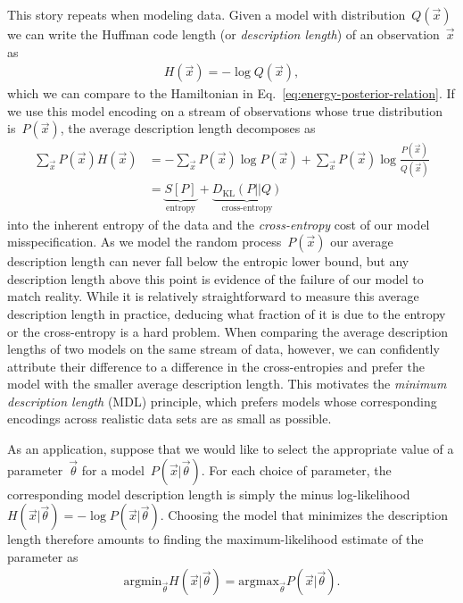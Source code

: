 This story repeats when modeling data. Given a model with distribution~$Q(\vec{x})$ we can write the Huffman code length (or \emph{description length}) of an observation~$\vec{x}$ as \begin{align}
    H(\vec{x}) = -\log Q(\vec{x}),
\end{align} 
which we can compare to the Hamiltonian in Eq.~\eqref{eq:energy-posterior-relation}. If we use this model encoding on a stream of observations whose true distribution is~$P(\vec{x})$, the average description length decomposes as \begin{align}
    \sum_{\vec{x}} P(\vec{x}) H(\vec{x}) &= -\sum_{\vec{x}} P(\vec{x})\log P(\vec{x}) + \sum_{\vec{x}} P(\vec{x})\log \frac{P(\vec{x})}{Q(\vec{x})} \nonumber \\
    &= \underbrace{S[P]}_{\text{entropy}} +  \underbrace{D_{\text{KL}}(P||Q)}_{\text{cross-entropy}}
\end{align}
into the inherent entropy of the data and the \emph{cross-entropy} cost of our model misspecification. As we model the random process~$P(\vec{x})$ our average description length can never fall below the entropic lower bound, but any description length above this point is evidence of the failure of our model to match reality. While it is relatively straightforward to measure this average description length in practice, deducing what fraction of it is due to the entropy or the cross-entropy is a hard problem. When comparing the average description lengths of two models on the same stream of data, however, we can confidently attribute their difference to a difference in the cross-entropies and prefer the model with the smaller average description length. This motivates the \emph{minimum description length} (MDL) principle, which prefers models whose corresponding encodings across realistic data sets are as small as possible. 

As an application, suppose that we would like to select the appropriate value of a parameter~$\vec{\theta}$ for a model~$P(\vec{x}|\vec{\theta})$. For each choice of parameter, the corresponding model description length is simply the minus log-likelihood~$H(\vec{x}|\vec{\theta}) = -\log P(\vec{x}|\vec{\theta})$. Choosing the model that minimizes the description length therefore amounts to finding the maximum-likelihood estimate of the parameter as \begin{align}
    \text{argmin}_{\vec{\theta}} H(\vec{x}|\vec{\theta}) = \text{argmax}_{\vec{\theta}} P(\vec{x}|\vec{\theta}).
\end{align}

